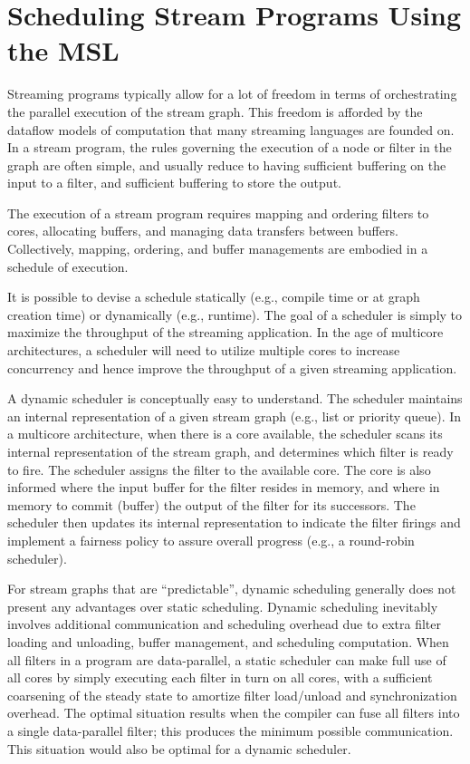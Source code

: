 \section{Scheduling Stream Programs Using the MSL}\label{ch:ds}

Streaming programs typically allow for a lot of freedom in terms of
orchestrating the parallel execution of the stream graph. This freedom is
afforded by the dataflow models of computation that many streaming
languages are founded on. In a stream program, the rules governing the
execution of a node or filter in the graph are often simple, and usually
reduce to having sufficient buffering on the input to a filter, and
sufficient buffering to store the output.

The execution of a stream program requires mapping and ordering filters
to cores, allocating buffers, and managing data transfers between
buffers. Collectively, mapping, ordering, and buffer managements are
embodied in a schedule of execution.

It is possible to devise a schedule statically (e.g., compile time or
at graph creation time) or dynamically (e.g., runtime). The goal of a
scheduler is simply to maximize the throughput of the streaming
application. In the age of multicore architectures, a scheduler will
need to utilize multiple cores to increase concurrency and hence improve
the throughput of a given streaming application. 

A dynamic scheduler is conceptually easy to understand. The scheduler
maintains an internal representation of a given stream graph (e.g.,
list or priority queue). In a multicore architecture, when there is a
core available, the scheduler scans its internal representation of the
stream graph, and determines which filter is ready to fire.
The scheduler assigns the filter to the available core. The core is
also informed where the input buffer for the filter resides in memory,
and where in memory to commit (buffer) the output of the filter for its
successors. The scheduler then updates its internal representation to
indicate the filter firings and implement a fairness policy to assure
overall progress (e.g., a round-robin scheduler).

For stream graphs that are ``predictable'', dynamic scheduling
generally does not present any advantages over static
scheduling. Dynamic scheduling inevitably involves additional
communication and scheduling overhead due to extra filter loading and
unloading, buffer management, and scheduling computation. When all
filters in a program are data-parallel, a static scheduler can make
full use of all cores by simply executing each filter in turn on all
cores, with a sufficient coarsening of the steady state to amortize
filter load/unload and synchronization overhead. The optimal
situation results when the compiler can fuse all filters into a single
data-parallel filter; this produces the minimum possible communication.
This situation would also be optimal for a dynamic scheduler.


